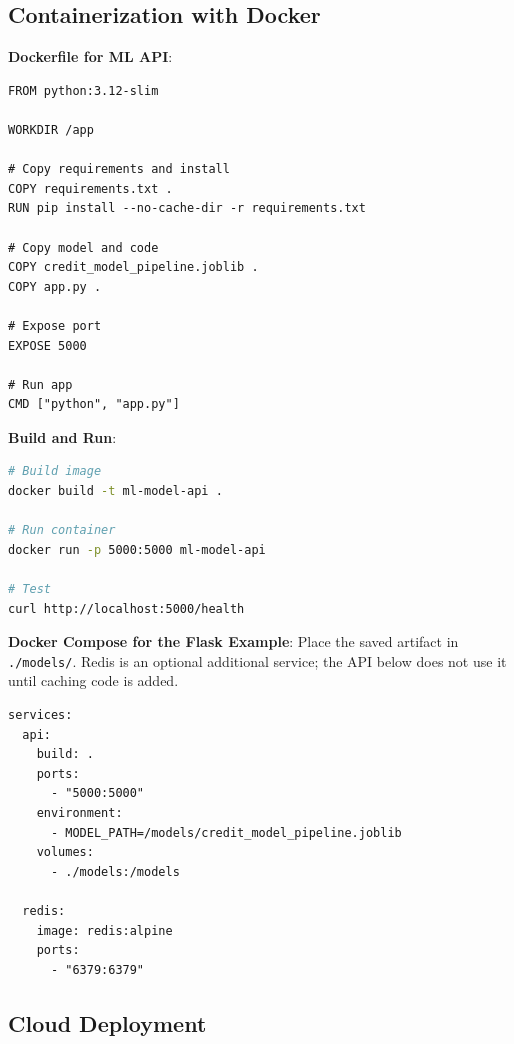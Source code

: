\documentclass[11pt,twoside]{article}
\numberwithin{equation}{section}
\theoremstyle{plain}
\theoremstyle{definition}
\theoremstyle{remark}
\begin{document}
\subsection{Containerization with Docker}

\begin{implementationbox}
\textbf{Dockerfile for ML API}:

\begin{lstlisting}
FROM python:3.12-slim

WORKDIR /app

# Copy requirements and install
COPY requirements.txt .
RUN pip install --no-cache-dir -r requirements.txt

# Copy model and code
COPY credit_model_pipeline.joblib .
COPY app.py .

# Expose port
EXPOSE 5000

# Run app
CMD ["python", "app.py"]
\end{lstlisting}

\textbf{Build and Run}:
\begin{lstlisting}[language=bash]
# Build image
docker build -t ml-model-api .

# Run container
docker run -p 5000:5000 ml-model-api

# Test
curl http://localhost:5000/health
\end{lstlisting}

\textbf{Docker Compose for the Flask Example}: Place the saved artifact in \texttt{./models/}. Redis is an optional additional service; the API below does not use it until caching code is added.
\begin{lstlisting}
services:
  api:
    build: .
    ports:
      - "5000:5000"
    environment:
      - MODEL_PATH=/models/credit_model_pipeline.joblib
    volumes:
      - ./models:/models
  
  redis:
    image: redis:alpine
    ports:
      - "6379:6379"
\end{lstlisting}
\end{implementationbox}

\subsection{Cloud Deployment}
\end{document}
